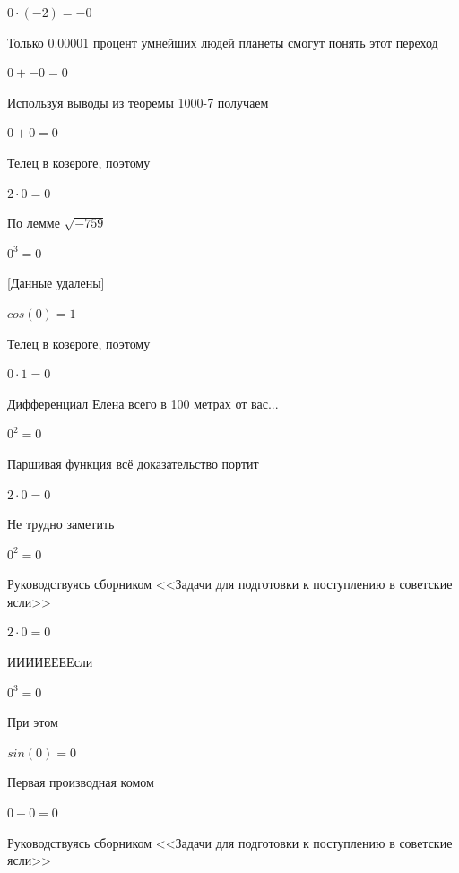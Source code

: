 \documentclass[12pt,a4paper,fleqn]{article}
\begin{document}
\begin{center}$0 \cdot (-2) = -0$\end{center}
Только 0.00001 процент умнейших людей планеты смогут понять этот переход

\begin{center}$0+-0 = 0$\end{center}
Используя выводы из теоремы 1000-7 получаем

\begin{center}$0+0 = 0$\end{center}
Телец в козероге, поэтому

\begin{center}$2 \cdot 0 = 0$\end{center}
По лемме $\sqrt{-759}$
\begin{center}$0^{3} = 0$\end{center}
[Данные удалены]

\begin{center}$cos(0) = 1$\end{center}
Телец в козероге, поэтому

\begin{center}$0 \cdot 1 = 0$\end{center}
Дифференциал Елена всего в 100 метрах от вас...

\begin{center}$0^{2} = 0$\end{center}
Паршивая функция всё доказательство портит\cite{link2}

\begin{center}$2 \cdot 0 = 0$\end{center}
Не трудно заметить

\begin{center}$0^{2} = 0$\end{center}
Руководствуясь сборником <<Задачи для подготовки к поступлению в советские ясли>>\cite{link1}

\begin{center}$2 \cdot 0 = 0$\end{center}
ИИИИЕЕЕЕсли\cite{link3}

\begin{center}$0^{3} = 0$\end{center}
При этом

\begin{center}$sin(0) = 0$\end{center}
Первая производная комом\cite{link2}

\begin{center}$0-0 = 0$\end{center}
Руководствуясь сборником <<Задачи для подготовки к поступлению в советские ясли>>\cite{link1}
\end{document}
